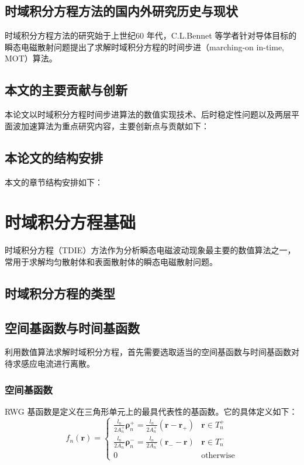 \documentclass[master]{thesis-uestc}
\begin{document}
\section{时域积分方程方法的国内外研究历史与现状}
时域积分方程方法的研究始于上世纪60 年代，C.L.Bennet 等学者针对导体目标的瞬态电磁散射问题提出了求解时域积分方程的时间步进（marching-on in-time, MOT）算法。

\section{本文的主要贡献与创新}
本论文以时域积分方程时间步进算法的数值实现技术、后时稳定性问题以及两层平面波加速算法为重点研究内容，主要创新点与贡献如下：

\section{本论文的结构安排}
本文的章节结构安排如下：

\chapter{时域积分方程基础}
时域积分方程（TDIE）方法作为分析瞬态电磁波动现象最主要的数值算法之一，常用于求解均匀散射体和表面散射体的瞬态电磁散射问题。

\section{时域积分方程的类型}

\section{空间基函数与时间基函数}
利用数值算法求解时域积分方程，首先需要选取适当的空间基函数与时间基函数对待求感应电流进行离散。

\subsection{空间基函数}
RWG 基函数是定义在三角形单元上的最具代表性的基函数。它的具体定义如下：
\begin{equation}
f_n(\bm{r})=
\begin{cases}
\frac{l_n}{2A_n^+}\bm{\rho}_n^+=\frac{l_n}{2A_n^+}(\bm{r}-\bm{r}_+)&\bm{r}\in T_n^+\\
\frac{l_n}{2A_n^-}\bm{\rho}_n^-=\frac{l_n}{2A_n^-}(\bm{r}_--\bm{r})&\bm{r}\in T_n^-\\
0&\text{otherwise}
\end{cases}
\end{equation}
\end{document}
